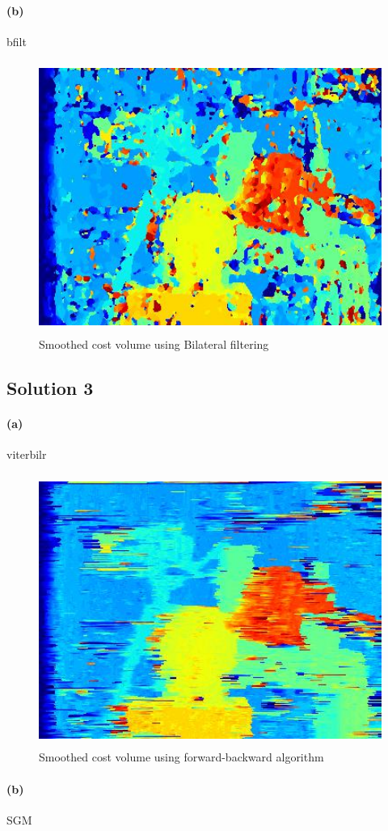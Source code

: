 \documentclass{article}
\newcommand{\solution}[1]{\clearpage \subsection*{Solution #1}}  %
\newcommand{\spart}[1]{\paragraph{(#1)}}
\begin{document}
\spart{b}
bfilt
\begin{figure}[h!]
  \centering
	\includegraphics[height=24em]{code/outputs/prob2b.jpg}
	  \caption{Smoothed cost volume using Bilateral filtering}
\end{figure}

\solution{3}
\spart{a}
viterbilr
\begin{figure}[h!]
  \centering
	\includegraphics[height=24em]{code/outputs/prob3a.jpg}
	  \caption{Smoothed cost volume using forward-backward algorithm}
\end{figure}

\spart{b}
SGM
\end{document}
